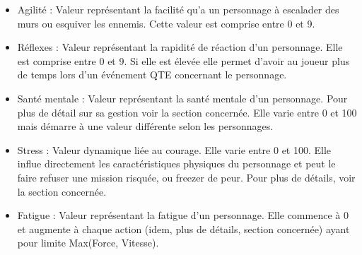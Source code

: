 \begin{itemize}
  \item Agilité : Valeur représentant la facilité qu'a un personnage à escalader des murs ou esquiver les ennemis. Cette valeur est comprise entre 0 et 9.
  \item Réflexes : Valeur représentant la rapidité de réaction d'un personnage. Elle est comprise entre 0 et 9. Si elle est élevée elle permet d'avoir au joueur plus de temps lors d'un événement QTE concernant le personnage.
  \item Santé mentale : Valeur représentant la santé mentale d'un personnage. Pour plus de détail sur sa gestion voir la section concernée. Elle varie entre 0 et 100 mais démarre à une valeur différente selon les personnages.
  \item Stress : Valeur dynamique liée au courage. Elle varie entre 0 et 100. Elle influe directement les caractéristiques physiques du personnage et peut le faire refuser une mission risquée, ou freezer de peur. Pour plus de détails, voir la section concernée.
  \item Fatigue : Valeur représentant la fatigue d'un personnage. Elle commence à 0 et augmente à chaque action (idem, plus de détails, section concernée) ayant pour limite Max(Force, Vitesse).
\end{itemize}

